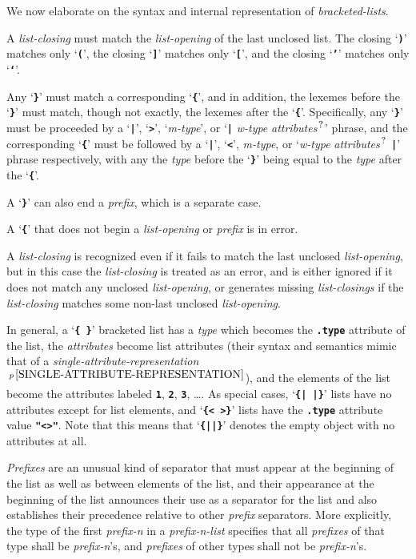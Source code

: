 \documentclass[12pt]{article}
\makeatletter
\newcommand{\TT}[1]{{\tt \bfseries #1}}
\newcommand{\ttdmkey}[2]{\TT{.#1}\index{#1@{\tt .#1!#2}}}
\newcommand{\pagnote}[1]{$\,^{p\,\pageref{#1}}$}
\newcommand{\QMARK}{{$^{\,\mbox{\footnotesize ?}}$}}
\makeatother
\begin{document}
We now elaborate on the syntax and internal representation
of {\em bracketed-lists}.

A {\em list-closing} must match the {\em list-opening} of the last unclosed
list.  The closing `\TT{)}' matches only `\TT{(}', the closing
`\TT{]}' matches only `\TT{[}', and the
closing `\TT{'}' matches only `\TT{`}'.

Any `\TT{\}}' must match a corresponding `\TT{\{}', and in addition,
the lexemes before the `\TT{\}}' must match, though not
exactly, the lexemes after the `\TT{\{}'.  Specifically, any
`\TT{\}}' must be proceeded by a `\TT{|}', `\TT{>}', `{\em m-type}', or
`\TT{|} {\em w-type} {\em attributes}\QMARK{}' phrase, and the
corresponding `\TT{\{}' must be followed by a `\TT{|}', `\TT{<}', {\em m-type},
or `{\em w-type} {\em attributes}\QMARK{} \TT{|}' phrase respectively,
with any the {\em type} before the `\TT{\}}' being equal to the
{\em type} after the `\TT{\{}'.

A `\TT{\}}' can also end a {\em prefix}, which is a separate case.

A `\TT{\{}' that does not begin a {\em list-opening} or {\em prefix} is
in error.

A {\em list-closing} is recognized even if it fails to match the
last unclosed {\em list-opening}, but in this case the {\em list-closing}
is treated as an error, and is either ignored if it does not
match any unclosed {\em list-opening}, or generates missing
{\em list-closings} if the {\em list-closing} matches some non-last unclosed
{\em list-opening}.

In general, a `\TT{\{~\}}' bracketed list has a {\em type} which becomes
the \ttdmkey{type}{of list} attribute of the list, the {\em attributes}
become list attributes (their syntax and semantics mimic
that of a {\em single-attribute-representation}%
\pagnote{SINGLE-ATTRIBUTE-REPRESENTATION}), and the elements of the
list become the attributes labeled \TT{1}, \TT{2}, \TT{3}, \ldots.
As special cases, `\TT{\{|~|\}}' lists have no attributes except for
list elements, and `\TT{\{<~>\}}' lists have the \TT{.type} attribute
value \TT{"<>"}.  Note that this means that `\TT{\{||\}}' denotes the
empty object with no attributes at all.

{\em Prefixes} are an unusual kind of separator
that must appear at the beginning of the list as well as between
elements of the list, and their appearance at the beginning of the list
announces their use as a separator for the list and also establishes their
precedence relative to other {\em prefix} separators.
More explicitly, the type of the first {\em prefix-n} in a {\em prefix-n-list}
specifies that all {\em prefixes} of that type shall be {\em prefix-n}'s,
and {\em prefixes} of other types shall not be {\em prefix-n}'s.
\end{document}
